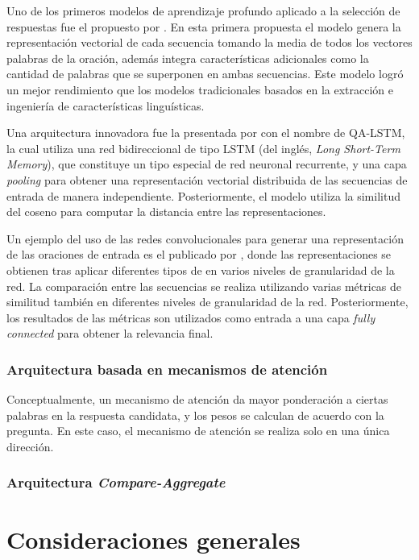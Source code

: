 Uno de los primeros modelos de aprendizaje profundo aplicado a la selección de respuestas fue el propuesto por \cite{2014-yu-answer-sentence}. En esta primera propuesta el modelo genera la representación vectorial de cada secuencia tomando la media de todos los vectores palabras de la oración, además integra características adicionales como la cantidad de palabras que se superponen en ambas secuencias. Este modelo logró un mejor rendimiento que los modelos tradicionales basados en la extracción e ingeniería de características linguísticas.

Una arquitectura innovadora fue la presentada por \cite{2015-tan-qalstm} con el nombre de QA-LSTM, la cual utiliza una red bidireccional de tipo LSTM (del inglés, \textit{Long Short-Term Memory}), que constituye un tipo especial de red neuronal recurrente, y una capa \textit{pooling} para obtener una representación vectorial distribuida de las secuencias de entrada de manera independiente. Posteriormente, el modelo utiliza la similitud del coseno para computar la distancia entre las representaciones. 

Un ejemplo del uso de las redes convolucionales para generar una representación de las oraciones de entrada es el publicado por \cite{2015-moschitti-cnn}, donde las representaciones se obtienen tras aplicar diferentes tipos de  en varios niveles de granularidad de la red. La comparación entre las secuencias se realiza utilizando varias métricas de similitud también en diferentes niveles de granularidad de la red. Posteriormente, los resultados de las métricas son utilizados como entrada a una capa \textit{fully connected} para obtener la relevancia final. 

\subsubsection{Arquitectura basada en mecanismos de atención}

Conceptualmente, un mecanismo de atención da mayor ponderación a ciertas palabras en la respuesta candidata, y los pesos se calculan de acuerdo con la pregunta. En este caso, el mecanismo de atención se realiza solo en una única dirección.

\subsubsection{Arquitectura \textit{Compare-Aggregate}}


\section{Consideraciones generales}

